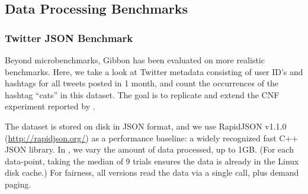 \subsection{Data Processing Benchmarks}



\subsubsection{Twitter JSON Benchmark}

Beyond microbenchmarks, Gibbon has been evaluated on more realistic benchmarks.
Here, we take a look at Twitter metadata consisting of user ID's and hashtags
for all tweets posted in 1 month, and count the occurrences of the hashtag
``cats'' in this dataset. The goal is to replicate and extend the CNF experiment
reported by \cite{cnf-icfp15}.

The dataset is stored on disk in JSON format, and we use RapidJSON v1.1.0
({\footnotesize\url{http://rapidjson.org/}}) as a performance baseline: a widely
recognized fast C++ JSON library.
%
In , we vary the amount of data processed,
up to 1GB. (For each data-point, taking the median of 9 trials
ensures the data is already in the Linux disk cache.)
%
For fairness, all versions read the data via a single  call, plus
demand paging.

